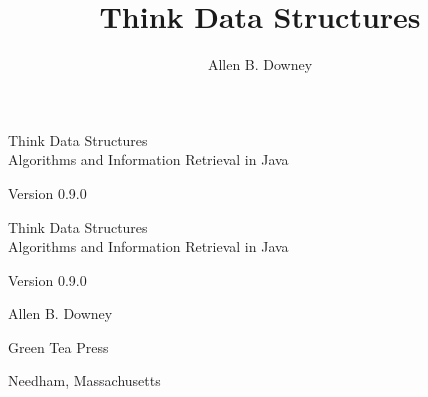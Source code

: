 \documentclass[12pt]{book}
\title{Think Data Structures}
\author{Allen B. Downey}
\newcommand{\thetitle}{Think Data Structures}
\newcommand{\thesubtitle}{Algorithms and Information Retrieval in Java}
\newcommand{\theauthors}{Allen B. Downey}
\newcommand{\theversion}{0.9.0}
\theoremstyle{exercise}
\newif\ifplastex
\begin{document}
\frontmatter

\ifplastex

\maketitle

\else

\begin{latexonly}

\thispagestyle{empty}

\begin{flushright}
\vspace*{2.0in}

\begin{spacing}{3}
{\huge \thetitle} \\
{\Large \thesubtitle}
\end{spacing}

\vspace{0.25in}

Version \theversion

\vfill
\end{flushright}

\newpage
\thispagestyle{empty}

\quad

\newpage
\thispagestyle{empty}

\begin{flushright}
\vspace*{2.0in}

\begin{spacing}{3}
{\huge \thetitle} \\
{\Large \thesubtitle}
\end{spacing}

\vspace{0.25in}

Version \theversion

\vspace{1in}

{\Large \theauthors}

\vspace{0.5in}

{\Large Green Tea Press}

{\small Needham, Massachusetts}

\vfill
\end{flushright}


\end{latexonly}
\end{document}

